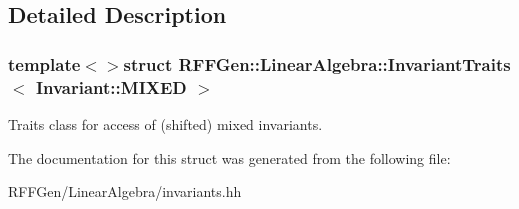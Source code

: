 \subsection{Detailed Description}
\subsubsection*{template$<$$>$struct R\-F\-F\-Gen\-::\-Linear\-Algebra\-::\-Invariant\-Traits$<$ Invariant\-::\-M\-I\-X\-E\-D $>$}

Traits class for access of (shifted) mixed invariants. 

The documentation for this struct was generated from the following file\-:\begin{DoxyCompactItemize}
\item 
R\-F\-F\-Gen/\-Linear\-Algebra/invariants.\-hh\end{DoxyCompactItemize}
